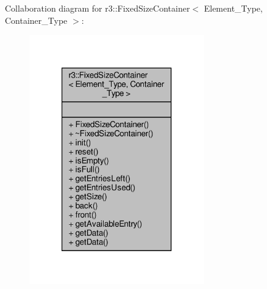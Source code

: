 Collaboration diagram for r3\+:\+:Fixed\+Size\+Container$<$ Element\+\_\+\+Type, Container\+\_\+\+Type $>$\+:\nopagebreak
\begin{figure}[H]
\begin{center}
\leavevmode
\includegraphics[width=215pt]{classr3_1_1_fixed_size_container__coll__graph}
\end{center}
\end{figure}
